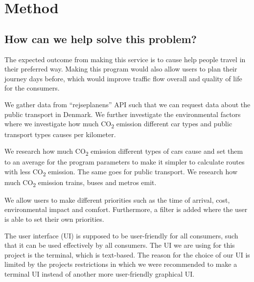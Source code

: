 \chapter{Method}\label{ch:method}


\section{How can we help solve this problem?}\label{sec:how-can-we-help-solve-this-problem?}

The expected outcome from making this service is to cause help people travel in their preferred way.
Making this program would also allow users to plan their journey days before, which would improve traffic flow
overall and quality of life for the consumers.

We gather data from ``rejseplanens'' API such that we can request data about the public transport in Denmark.
We further investigate the environmental factors where we investigate how much \unit{CO_{2}} emission
different car types and public transport types causes per kilometer.

We research how much \unit{CO_{2}} emission different types of cars cause and set them to an average for
the program parameters to make it simpler to calculate routes with less \unit{CO_{2}} emission.
The same goes for public transport.
We research how much \unit{CO_{2}} emission trains, buses and metros emit.

We allow users to make different priorities such as the time of arrival, cost, environmental impact and comfort.
Furthermore, a filter is added where the user is able to set their own priorities.

The user interface (UI) is supposed to be user-friendly for all consumers, such that it can be used effectively by all
consumers.
The UI we are using for this project is the terminal, which is text-based.
The reason for the choice of our UI is limited by the projects restrictions in which we were recommended to make a
terminal UI instead of another more user-friendly graphical UI\@.




